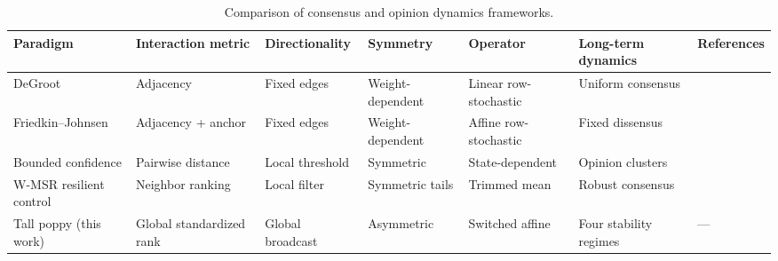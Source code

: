 \begin{table}[htbp]
  \centering
  \caption{Comparison of consensus and opinion dynamics frameworks.}
  \label{tab:comparison}
  \small
  \begin{tabular}{p{2.2cm}p{2.4cm}p{2.0cm}p{1.6cm}p{2.4cm}p{2.2cm}p{2.0cm}}
    \toprule
    Paradigm & Interaction metric & Directionality & Symmetry & Operator & Long-term dynamics & References \\
    \midrule
    DeGroot & Adjacency & Fixed edges & Weight-dependent & Linear row-stochastic & Uniform consensus & \cite{degroot1974reaching} \\
    Friedkin--Johnsen & Adjacency + anchor & Fixed edges & Weight-dependent & Affine row-stochastic & Fixed dissensus & \cite{friedkin1990social} \\
    Bounded confidence & Pairwise distance & Local threshold & Symmetric & State-dependent & Opinion clusters & \cite{bernardo2022finite} \\
    W-MSR resilient control & Neighbor ranking & Local filter & Symmetric tails & Trimmed mean & Robust consensus & \cite{leblanc2013resilient} \\
    Tall poppy (this work) & Global standardized rank & Global broadcast & Asymmetric & Switched affine & Four stability regimes & --- \\
    \bottomrule
  \end{tabular}
\end{table}
